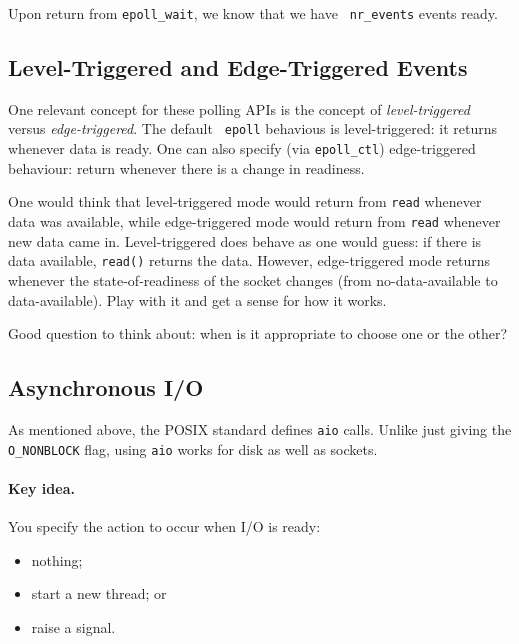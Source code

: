 Upon return from {\tt epoll\_wait}, we know that we have {\tt
  nr\_events} events ready.

\subsection*{Level-Triggered and Edge-Triggered Events}
One relevant concept for these polling APIs is the concept of
\emph{level-triggered} versus \emph{edge-triggered}.  The default {\tt
  epoll} behavious is level-triggered: it returns whenever data is
ready. One can also specify (via {\tt epoll\_ctl}) edge-triggered
behaviour: return whenever there is a change in readiness.


One would think that level-triggered mode would return from {\tt read}
whenever data was available, while edge-triggered mode would return
from {\tt read} whenever new data came in. Level-triggered does behave
as one would guess: if there is data available, {\tt read()} returns
the data. However, edge-triggered mode returns whenever the
state-of-readiness of the socket changes (from no-data-available to
data-available). Play with it and get a sense for how it works.

Good question to think about: when is it appropriate to choose one or the other?

\subsection*{Asynchronous I/O}
As mentioned above, the POSIX standard defines {\tt aio} calls.
Unlike just giving the {\tt O\_NONBLOCK} flag, using {\tt aio} works
for disk as well as sockets.

\paragraph{Key idea.} You specify the action to occur when I/O is ready:
    \begin{itemize}
      \item nothing;
      \item start a new thread; or
      \item raise a signal.
    \end{itemize}

